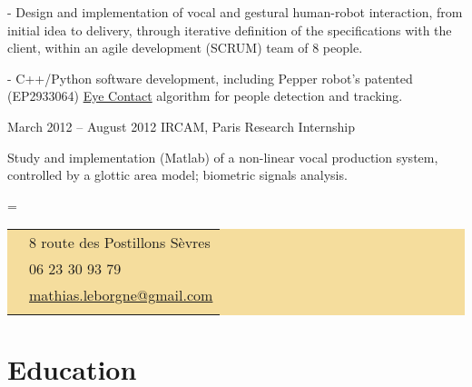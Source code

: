 \documentclass{tccv}
\renewcommand\personal[5][]{%
    \needspace{0.5\textheight}%
    \newdimen\boxwidth%
    \boxwidth=\dimexpr\linewidth-2\fboxsep\relax%
    \newlength\tailleImage%
    \settoheight\tailleImage{\texttt{[image: \#5]}}%
    \newlength\ex%
    \settoheight\ex{a}%
    \newlength\declg%
    \setlength\declg{0.5\tailleImage}%
    \addtolength\declg{-0.5\ex}%
    \colorbox[HTML]{F5DD9D}{%
    \begin{tabularx}{0.75\boxwidth}{c|X}%
    \Writinghand & {#2} \smallskip\\
    \Telefon     & {#3} \smallskip\\
    \Letter      & \href{mailto:#4}{#4}
    \ifstrempty{#1}{}{\smallskip\\ \Lightning & \href{http://#1}{#1}}
    \end{tabularx}%
    \raisebox{-\declg}{\texttt{[image: \#5]}}%
    }}
\begin{document}
\begin{eventlist}
  - Design and implementation of vocal and gestural human-robot interaction, from initial idea to delivery, through iterative definition of the specifications with the client, within an agile development (SCRUM) team of 8 people.

  - C++/Python software development, including Pepper robot's patented (EP2933064) \href{http://doc.aldebaran.com/2-5/naoqi/interaction/autonomousabilities/albasicawareness.html#albasicawareness}{Eye Contact} algorithm for people detection and tracking.

\item{March 2012 -- August 2012}
     {IRCAM, Paris}
     {Research Internship}

Study and implementation (Matlab) of a non-linear vocal production system, 
controlled by a glottic area model; biometric signals analysis.








    



\personal
    {8 route des Postillons
     \newline 92310 Sèvres}
    {06 23 30 93 79}
    {mathias.leborgne@gmail.com}
    {photo_acms_selfie} %


\section{Education}


\end{eventlist}
\end{document}
